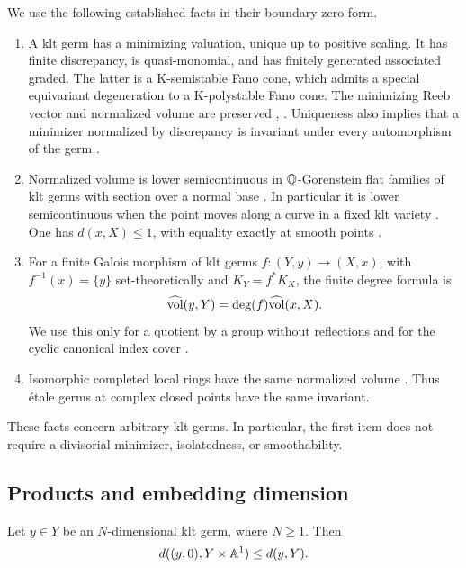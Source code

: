 We use the following established facts in their boundary-zero form.
\begin{enumerate}[label=(\roman*)]
\item A klt germ has a minimizing valuation, unique up to positive
scaling. It has finite discrepancy, is quasi-monomial, and has
finitely generated associated graded. The latter is a K-semistable
Fano cone, which admits a special equivariant degeneration to a
K-polystable Fano cone. The minimizing Reeb vector and normalized
volume are preserved \cite[Theorem~1.2]{XZStable},
\cite[Theorem~1.2]{LWX21}. Uniqueness also implies that a minimizer
normalized by discrepancy is invariant under every automorphism of
the germ \cite[Theorem~1.1 and Corollary~1.2]{XZ21}.
\item Normalized volume is lower semicontinuous in
\(\mathbb Q\)-Gorenstein flat families of klt germs with section over a normal base
\cite[Theorem~1]{BL21}. In particular it is lower semicontinuous
when the point moves along a curve in a fixed klt variety
\cite[Theorem~33(1)]{BL21}. One has
\(d(x,X)\le1\), with equality exactly at smooth points
\cite[Theorem~1.6]{LX19}.
\item For a finite Galois morphism of klt germs
\(f\colon (Y,y)\to(X,x)\), with \(f^{-1}(x)=\{y\}\) set-theoretically
and \(K_Y=f^*K_X\), the finite degree formula is
\begin{equation}\label{cone:eq-cover}
              \widehat{\operatorname{vol}}(y,Y)=\deg(f)\widehat{\operatorname{vol}}(x,X).
\end{equation}
We use this only for a quotient by a group without reflections and
for the cyclic canonical index cover
\cite[Theorem~1.3]{XZ21}.
\item Isomorphic completed local rings have the same normalized
volume \cite[Lemma~2.15]{Liu22}. Thus étale germs at complex closed
points have the same invariant.
\end{enumerate}
These facts concern arbitrary klt germs. In particular, the first
item does not require a divisorial minimizer, isolatedness, or
smoothability.

\subsection{Products and embedding dimension}

\begin{lemma}\label{cone:product}
Let \(y\in Y\) be an \(N\)-dimensional klt germ, where \(N\ge1\). Then
\[
          d((y,0),Y\times\mathbb A^1)\le d(y,Y).
\]
\end{lemma}

